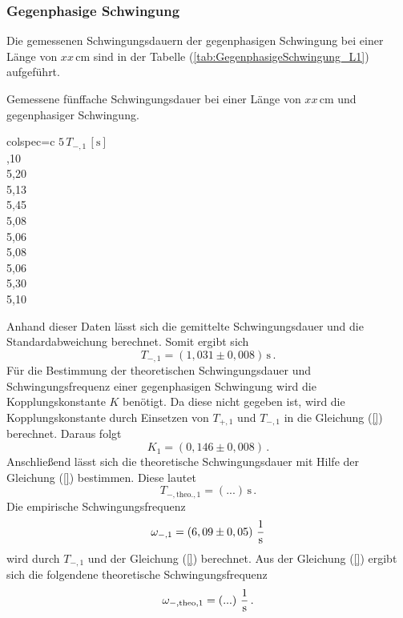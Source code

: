 \subsubsection{Gegenphasige Schwingung}
\label{sec:GegenphasigeSchwingung_KurzelPendel}
Die gemessenen Schwingungsdauern der gegenphasigen Schwingung bei einer Länge von $xx\, \unit{\centi\meter}$ sind 
in der Tabelle (\ref{tab:GegenphasigeSchwingung_L1}) aufgeführt. 
\begin{table}[H]
  \centering
  \caption{Gemessene fünffache Schwingungsdauer bei einer Länge von $xx\, \unit{\centi\meter}$ und gegenphasiger Schwingung.}
  \label{tab:GegenphasigeSchwingung_L1}
  \begin{tblr}{colspec={c}}
      \toprule
      $5\, T_{-, 1}\,\left[\unit{\second}\right]$\\
      ,10 \\
      5,20 \\
      5,13 \\
      5,45 \\
      5,08 \\
      5,06 \\
      5,08 \\
      5,06 \\
      5,30 \\
      5,10 \\
      \bottomrule
  \end{tblr}
\end{table}
Anhand dieser Daten lässt sich die gemittelte Schwingungsdauer und die Standardabweichung berechnet. Somit ergibt sich
$$T_{-, 1} = \left(1,031 \pm 0,008 \right)\, \unit{\second}\,.$$ 
Für die Bestimmung der theoretischen Schwingungsdauer und Schwingungsfrequenz einer gegenphasigen Schwingung wird die Kopplungskonstante $K$ benötigt. Da
diese nicht gegeben ist, wird die Kopplungskonstante durch Einsetzen von $T_{+,1}$ und $T_{-,1}$ in die Gleichung (\ref{}) berechnet.
Daraus folgt
$$K_1 = \left( 0,146 \pm 0,008 \right)\,.$$
Anschließend lässt sich die theoretische Schwingungsdauer mit Hilfe der Gleichung (\ref{}) bestimmen. Diese lautet
$$T_{-,\text{theo.},1} = \left( ... \right)\, \unit{\second}\,.$$
Die empirische Schwingungsfrequenz 
$$\omega_{-,1} = \left( 6,09 \pm 0,05 \right)\, \unit[per-mode=fraction]{\per \second}$$ wird durch $T_{-,1}$ und der Gleichung (\ref{})
berechnet. Aus der Gleichung (\ref{}) ergibt sich die folgendene theoretische Schwingungsfrequenz
$$\omega_{-,\text{theo},1} = \left( ... \right)\,\unit[per-mode=fraction]{\per \second}\,.$$

